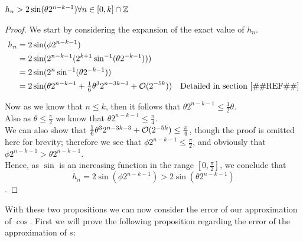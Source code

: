 \begin{Geo Trig Prop 2}
\label{THM_"Geo Trig Prop 2"}
\(h_n > 2\sin(\theta2^{n-k-1}) \forall n \in [0,k] \cap \mathbb{Z}\)
\end{Geo Trig Prop 2}
\begin{proof}
We start by considering the expansion of the exact value of \(h_n\).
\begin{displaymath}
	\begin{align*}
		h_n &= 2\sin(\phi2^{n-k-1})\\
			&= 2\sin(2^{n-k-1}(2^{k+1}\sin^{-1}(\theta2^{-k-1})))\\
			&= 2\sin(2^n\sin^{-1}(\theta2^{-k-1}))\\
			&= 2\sin(\theta2^{n-k-1} + \tfrac{1}{6}\theta^32^{n-3k -3} 
				+ \mathcal{O}(2^{-5k}))
				& \textrm{Detailed in section \ref{#REF#}}
	\end{align*}
\end{displaymath}

Now as we know that \(n \le k\), then it follows that \(\theta2^{n-k-1} \le \tfrac{1}{2}\theta\).\\

Also as \(\theta \le \tfrac{\pi}{2}\) we know that \(\theta2^{n-k-1} \le \tfrac{\pi}{4}\).\\

We can also show that \(\tfrac{1}{6}\theta^32^{n-3k-3} + \mathcal{O}(2^{-5k}) \le \tfrac{\pi}{4}\), though the proof is omitted here for brevity; therefore we see that \(\phi2^{n-k-1} \le \tfrac{\pi}{2}\), and obviously that \(\phi2^{n-k-1} > \theta2^{n-k-1}\).\\

Hence, as \(\sin\) is an increasing function in the range \([0, \tfrac{\pi}{2}]\), we conclude that \[h_n = 2\sin(\phi2^{n-k-1}) > 2\sin(\theta2^{n-k-1})\].
\end{proof}

With these two propositions we can now consider the error of our approximation of \(\cos\). First we will prove the following proposition regarding the error of the approximation of \(s\):

